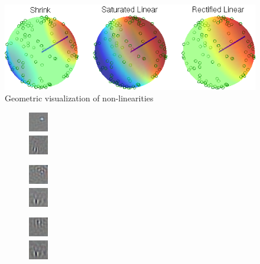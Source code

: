 \begin{figure} \centering \includegraphics[scale=0.5]{./figures/SATAE/viz_nonlin.png}
\caption{Geometric visualization of non-linearities}
\end{figure} 


\begin{figure} \centering \begin{subfigure}[b]{0.15\textwidth} \centering
\includegraphics[scale=2]{./figures/SATAE/1.png}\\ \includegraphics[scale=2]{./figures/SATAE/horse1.png} 
    \end{subfigure} \begin{subfigure}[b]{0.15\textwidth} \centering
    \includegraphics[scale=2]{./figures/SATAE/2.png} \\
    \includegraphics[scale=2]{./figures/SATAE/horse2.png} 
    \end{subfigure} \begin{subfigure}[b]{0.15\textwidth} \centering
    \includegraphics[scale=2]{./figures/SATAE/3.png}\\
    \includegraphics[scale=2]{./figures/SATAE/horse3.png} 
		

\end{subfigure}
\end{figure}
